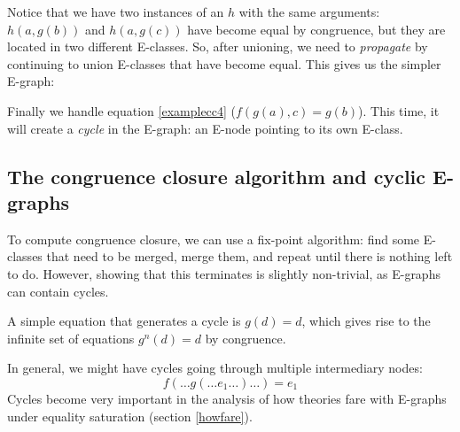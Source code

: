 \documentclass[12pt,a4paper,twoside,openright]{report}
\numberwithin{equation}{chapter}		%
\numberwithin{figure}{chapter}			%
\numberwithin{table}{chapter}			%
\theoremstyle{definition}
\theoremstyle{plain}
\def \globalscale {1.000000}
\begin{document}
Notice that we have two instances of an $h$ with the same arguments: $h(a, g(b))$ and $h(a, g(c))$ have become equal by congruence, but they are located in two different E-classes. So, after unioning, we need to \emph{propagate} by continuing to union E-classes that have become equal. This gives us the simpler E-graph:

\begin{center}
	\begin{tikzpicture}[y=1cm, x=1cm, yscale=\globalscale,xscale=\globalscale, every node/.append style={scale=\globalscale}, inner sep=0pt, outer sep=0pt]
		
	\end{tikzpicture}
	\label{exampleBasic6}
\end{center}

Finally we handle equation \ref{examplecc4} ($f(g(a), c) = g(b)$). This time, it will create a \emph{cycle} in the E-graph: an E-node pointing to its own E-class.

\begin{center}
	\begin{tikzpicture}[y=1cm, x=1cm, yscale=\globalscale,xscale=\globalscale, every node/.append style={scale=\globalscale}, inner sep=0pt, outer sep=0pt]
		
	\end{tikzpicture}
	\label{exampleBasic7}
\end{center}

\flushbottom
\subsection{The congruence closure algorithm and cyclic E-graphs} \label{ccalg}
To compute congruence closure, we can use a fix-point algorithm: find some E-classes that need to be merged, merge them, and repeat until there is nothing left to do. However, showing that this terminates is slightly non-trivial, as E-graphs can contain cycles.

A simple equation that generates a cycle is $g(d) = d$, which gives rise to the infinite set of equations $g^n(d) = d$ by congruence.

In general, we might have cycles going through multiple intermediary nodes:
$$f(\ldots g(\ldots e_1 \ldots) \ldots) = e_1$$
Cycles become very important in the analysis of how theories fare with E-graphs under equality saturation (section \ref{howfare}).
\end{document}

